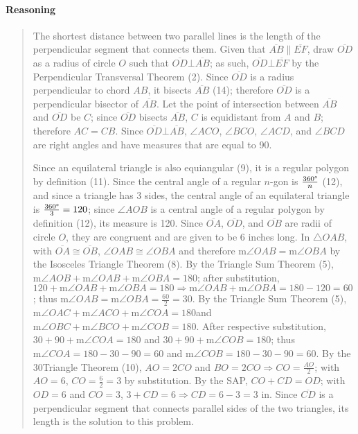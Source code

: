\documentclass[letterpaper,12pt,twoside]{report}
\begin{document}
	\paragraph{Reasoning}
	\begin{quotation}
	
	The shortest distance between two parallel lines is the length of the perpendicular segment that connects them. Given that $\overline{AB} \parallel \overline{EF}$, draw $\overline{OD}$ as a radius of circle $O$ such that $\overline{OD}\bot\overline{AB}$; as such, $\overline{OD}\bot\overline{EF}$ by the Perpendicular Transversal Theorem (2). Since $\overline{OD}$ is a radius perpendicular to chord $AB$, it bisects $\overline{AB}$ (14); therefore $\overline{OD}$ is a perpendicular bisector of $\overline{AB}$. Let the point of intersection between $\overline{AB}$ and $\overline{OD}$ be $C$; since $\overline{OD}$ bisects $\overline{AB}$, $C$ is equidistant from $A$ and $B$; therefore $AC=CB$. Since $\overline{OD}\bot\overline{AB}$, $\angle ACO$, $\angle BCO$, $\angle ACD$, and $\angle BCD$ are right angles and have measures that are equal to 90\textdegree.
	
	Since an equilateral triangle is also equiangular (9), it is a regular polygon by definition (11). Since the central angle of a regular $n$-gon is $\frac{360\text{\textdegree}}{n}$ (12), and since a triangle has 3 sides, the central angle of an equilateral triangle is $\frac{360\text{\textdegree}}{3}=120$\textdegree; since $\angle AOB$ is a central angle of a regular polygon by definition (12), its measure is 120\textdegree. Since $\overline{OA}$, $\overline{OD}$, and $\overline{OB}$ are radii of circle $O$, they are congruent and are given to be 6 inches long. In $\triangle OAB$, with $\overline{OA}\cong\overline{OB}$, $\angle OAB\cong\angle OBA$ and therefore $\text{m}\angle OAB=\text{m}\angle OBA$ by the Isosceles Triangle Theorem (8). By the Triangle Sum Theorem (5), $\text{m}\angle AOB+\text{m}\angle OAB+\text{m}\angle OBA=180$\textdegree; after substitution, $120+\text{m}\angle OAB+\text{m}\angle OBA=180 \Rightarrow \text{m}\angle OAB+\text{m}\angle OBA=180-120=60$; thus $\text{m}\angle OAB=\text{m}\angle OBA=\frac{60}{2}=30$. By the Triangle Sum Theorem (5), $\text{m}\angle OAC+\text{m}\angle ACO+\text{m}\angle COA=180$\textdegree \space and $\text{m}\angle OBC+\text{m}\angle BCO+\text{m}\angle COB=180$\textdegree. After respective substitution, $30+90+\text{m}\angle COA=180$ and $30+90+\text{m}\angle COB=180$; thus $\text{m}\angle COA=180-30-90=60$ and $\text{m}\angle COB=180-30-90=60$. By the 30\textdegree \space Triangle Theorem (10), $AO=2CO$ and $BO=2CO \Rightarrow CO=\frac{AO}{2}$; with $AO=6$, $CO=\frac{6}{2}=3$ by substitution. By the SAP, $CO+CD=OD$; with $OD=6$ and $CO=3$, $3+CD=6 \Rightarrow CD=6-3=\boxed{3 \text{  in}}$. Since $\overline{CD}$ is a perpendicular segment that connects parallel sides of the two triangles, its length is the solution to this problem.
	\end{quotation}
\end{document}
